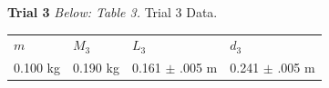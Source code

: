 \documentclass[12pt,letterpaper]{article}
\begin{document}
{{\hspace{-16pt}\textbf{Trial 3}
\newline
\textit{Below: Table 3.} Trial 3 Data.
{\renewcommand{\arraystretch}{1.2}
\begin{table}[h]
\hspace{1.1in}
\begin{tabular}{llll}
\hspace{0.4in}\(m\) & \hspace{0.4in}\(M_3\) & \hspace{0.4in} \(L_3\) & \hspace{0.4in} \(d_3\)\\
\hspace{0.2in}0.100 kg \hspace{0.2in}& \hspace{0.2in}0.190 kg\hspace{0.2in}& 0.161 \(\pm\) .005 m & 0.241  \(\pm\) .005 m \\                
\end{tabular}
\end{table}
\newpage
}}}
\end{document}
